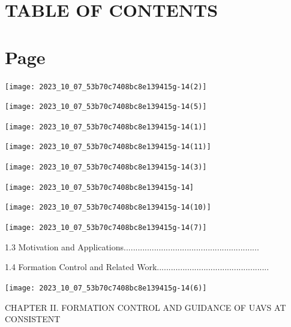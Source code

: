 \documentclass[10pt]{article}
\begin{document}
\section{TABLE OF CONTENTS}
\section{Page}
\begin{center}
\texttt{[image: 2023\_10\_07\_53b70c7408bc8e139415g-14(2)]}
\end{center}

\begin{center}
\texttt{[image: 2023\_10\_07\_53b70c7408bc8e139415g-14(5)]}
\end{center}

\begin{center}
\texttt{[image: 2023\_10\_07\_53b70c7408bc8e139415g-14(1)]}
\end{center}

\begin{center}
\texttt{[image: 2023\_10\_07\_53b70c7408bc8e139415g-14(11)]}
\end{center}

\begin{center}
\texttt{[image: 2023\_10\_07\_53b70c7408bc8e139415g-14(3)]}
\end{center}

\begin{center}
\texttt{[image: 2023\_10\_07\_53b70c7408bc8e139415g-14]}
\end{center}

\begin{center}
\texttt{[image: 2023\_10\_07\_53b70c7408bc8e139415g-14(10)]}
\end{center}

\begin{center}
\texttt{[image: 2023\_10\_07\_53b70c7408bc8e139415g-14(7)]}
\end{center}

1.3 Motivation and Applications..........................................................

1.4 Formation Control and Related Work................................................

\begin{center}
\texttt{[image: 2023\_10\_07\_53b70c7408bc8e139415g-14(6)]}
\end{center}

CHAPTER II. FORMATION CONTROL AND GUIDANCE OF UAVS AT CONSISTENT
\end{document}
